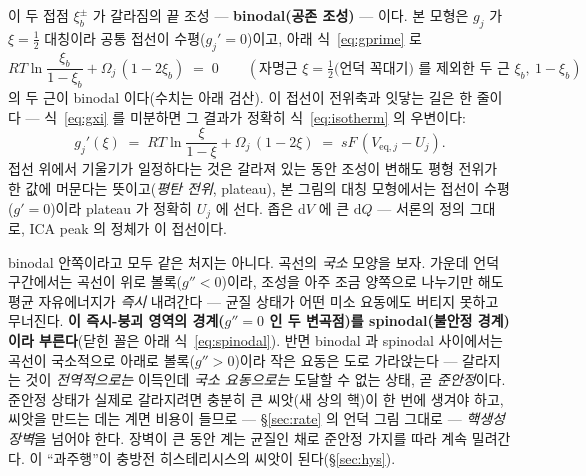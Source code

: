 \documentclass[11pt,a4paper]{article}
\newcommand{\dd}{\mathrm{d}}
\newcommand{\eq}{\mathrm{eq}}
\begin{document}
이 두 접점 $\xi_b^\pm$ 가 갈라짐의 끝 조성 — \textbf{binodal(공존 조성)} — 이다. 본 모형은
$g_j$ 가 $\xi=\tfrac12$ 대칭이라 공통 접선이 수평($g_j'=0$)이고, 아래 식~\eqref{eq:gprime} 로
\begin{equation}
RT\ln\frac{\xi_b}{1-\xi_b}+\Omega_j\,(1-2\xi_b)\;=\;0
\qquad(\text{자명근 }\xi=\tfrac12\text{(언덕 꼭대기) 를 제외한 두 근 }\xi_b,\ 1-\xi_b)
\label{eq:binodal}
\end{equation}
의 두 근이 binodal 이다(수치는 아래 검산). 이 접선이 전위축과 잇닿는 길은 한 줄이다 — 식~\eqref{eq:gxi} 를 미분하면 그 결과가 정확히
식~\eqref{eq:isotherm} 의 우변이다:
\begin{equation}
g_j'(\xi)\;=\;RT\ln\frac{\xi}{1-\xi}+\Omega_j\,(1-2\xi)
\;=\;sF\,(V_{\eq,j}-U_j).
\label{eq:gprime}
\end{equation} 접선 위에서 기울기가 일정하다는 것은 갈라져
있는 동안 조성이 변해도 평형 전위가 한 값에 머문다는 뜻이고(\emph{평탄 전위}, plateau), 본 그림의 대칭
모형에서는 접선이 수평($g'=0$)이라 plateau 가 정확히 $U_j$ 에 선다. 좁은 $\dd V$ 에 큰 $\dd Q$ —
서론의 정의 그대로, ICA peak 의 정체가 이 접선이다.

binodal 안쪽이라고 모두 같은 처지는 아니다. 곡선의 \emph{국소} 모양을 보자. 가운데 언덕 구간에서는 곡선이
위로 볼록($g''<0$)이라, 조성을 아주 조금 양쪽으로 나누기만 해도 평균 자유에너지가 \emph{즉시} 내려간다 —
균질 상태가 어떤 미소 요동에도 버티지 못하고 무너진다. \textbf{이 즉시-붕괴 영역의 경계($g''=0$ 인 두
변곡점)를 spinodal(불안정 경계)이라 부른다}(닫힌 꼴은 아래 식~\eqref{eq:spinodal}). 반면 binodal 과 spinodal 사이에서는 곡선이 국소적으로 아래로
볼록($g''>0$)이라 작은 요동은 도로 가라앉는다 — 갈라지는 것이 \emph{전역적으로는} 이득인데 \emph{국소
요동으로는} 도달할 수 없는 상태, 곧 \emph{준안정}이다. 준안정 상태가 실제로 갈라지려면 충분히 큰 씨앗(새
상의 핵)이 한 번에 생겨야 하고, 씨앗을 만드는 데는 계면 비용이 들므로 — \S\ref{sec:rate} 의 언덕 그림
그대로 — \emph{핵생성 장벽}을 넘어야 한다. 장벽이 큰 동안 계는 균질인 채로 준안정 가지를 따라 계속
밀려간다. 이 ``과주행''이 충방전 히스테리시스의 씨앗이 된다(\S\ref{sec:hys}).
\end{document}
